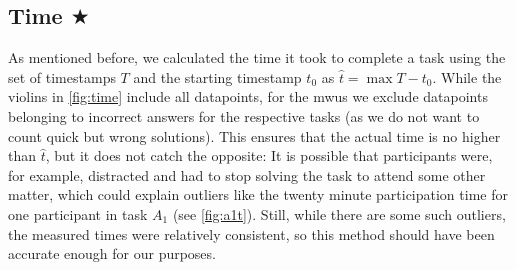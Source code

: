 \documentclass[../thesis]{subfiles}
\begin{document}
\subsection{Time $\bigstar$}\label{subsec:time}
As mentioned before, we calculated the time it took to complete a task using the set of timestamps $T$ and the starting timestamp $t_0$ as $\hat{t} = \max T - t_0$.
While the \glspl{violin} in \cref{fig:time} include all datapoints, for the \glspl{mwu} we exclude datapoints belonging to incorrect answers for the respective tasks (as we do not want to count quick but wrong solutions).
This ensures that the actual time is no higher than $\hat{t}$, but it does not catch the opposite:
It is possible that participants were, for example, distracted and had to stop solving the task to attend some other matter, which could explain outliers like the twenty minute participation time for one participant in task $A_1$ (see \cref{fig:a1t}).
Still, while there are some such outliers, the measured times were relatively consistent, so this method should have been accurate enough for our purposes.
\end{document}
